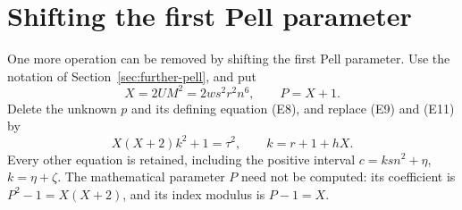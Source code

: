 \section{Shifting the first Pell parameter}\label{sec:shifted-pell}

One more operation can be removed by shifting the first Pell parameter.
Use the notation of Section~\ref{sec:further-pell}, and put
\[
 X=2UM^2=2ws^2r^2n^6,\qquad P=X+1.
\]
Delete the unknown $p$ and its defining equation (E8), and replace
(E9) and (E11) by
\begin{equation}\label{eq:shifted-pell-system}
 X(X+2)k^2+1=\tau^2,\qquad k=r+1+hX.
\end{equation}
Every other equation is retained, including the positive interval
$c=ksn^2+\eta$, $k=\eta+\zeta$.
The mathematical parameter $P$ need not be computed: its coefficient
is $P^2-1=X(X+2)$, and its index modulus is $P-1=X$.

